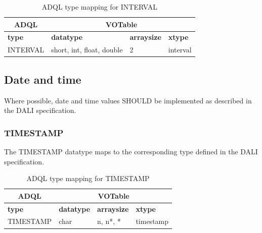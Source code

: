 \documentclass[11pt,a4paper]{ivoa}
\newcommand{\DALIspec}{DALI specification\xspace}
\begin{document}
\begin{table}[thm]\footnotesize
    \begin{tabular}
        {|p{}|p{}|p{}|p{}|}
        \hline

        \hline
        \multicolumn{1}{|c|}{\textbf{ADQL}} &
        \multicolumn{3}{|c|}{\textbf{VOTable}}
        \tabularnewline
        
        \hline
        \textbf{type} &
        \textbf{datatype} &
        \textbf{arraysize} &
        \textbf{xtype}
        \tabularnewline

        \hline
        INTERVAL &
        short, int, float, double &
        2 &
        interval
        \tabularnewline
        \hline
    \end{tabular}
    \caption{ADQL type mapping for INTERVAL}
    \label{table:types.numeric.interval}
\end{table}

\subsection{Date and time}
\label{sec:types.datetime}

Where possible, date and time values SHOULD be implemented as
described in the \DALIspec.

\subsubsection{TIMESTAMP}
\label{sec:types.datetime.timestamp}

The TIMESTAMP datatype maps to the corresponding type defined in the
\DALIspec.

\begin{table}[thm]\footnotesize
    \begin{tabular}
        {|p{}|p{}|p{}|p{}|}
        \hline

        \hline
        \multicolumn{1}{|c|}{\textbf{ADQL}} &
        \multicolumn{3}{|c|}{\textbf{VOTable}}
        \tabularnewline
        
        \hline
        \textbf{type} &
        \textbf{datatype} &
        \textbf{arraysize} &
        \textbf{xtype}
        \tabularnewline

        \hline
        TIMESTAMP &
        char &
        n, n*, * &
        timestamp
        \tabularnewline
        \hline
    \end{tabular}
    \caption{ADQL type mapping for TIMESTAMP}
    \label{table:types.datetime.timestamp}
\end{table}
\end{document}
